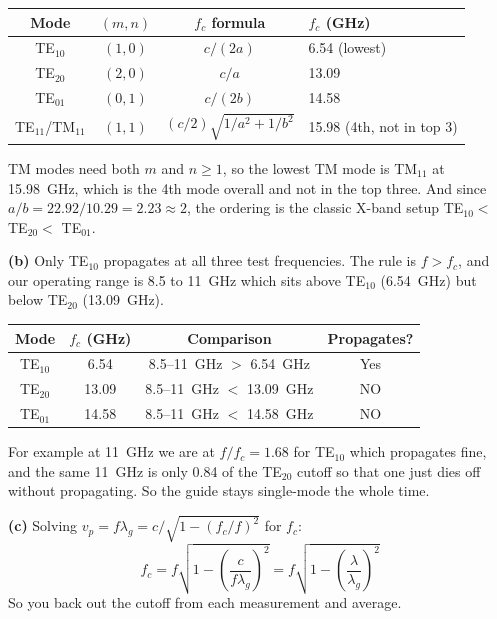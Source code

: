 \documentclass[11pt,letterpaper]{article}
\begin{document}
\begin{center}
\begin{tabular}{cccl}
\toprule
Mode & $(m,n)$ & $f_c$ formula & $f_c$ (GHz) \\
\midrule
TE$_{10}$         & $(1,0)$ & $c/(2a)$                  & 6.54 (lowest)        \\
TE$_{20}$         & $(2,0)$ & $c/a$                     & 13.09                \\
TE$_{01}$         & $(0,1)$ & $c/(2b)$                  & 14.58                \\
TE$_{11}$/TM$_{11}$ & $(1,1)$ & $(c/2)\sqrt{1/a^2+1/b^2}$ & 15.98 (4th, not in top 3) \\
\bottomrule
\end{tabular}
\end{center}

TM modes need both $m$ and $n \geq 1$, so the lowest TM mode is TM$_{11}$ at 15.98~GHz, which is the 4th mode overall and not in the top three. And since $a/b = 22.92/10.29 = 2.23 \approx 2$, the ordering is the classic X-band setup TE$_{10} <$ TE$_{20} <$ TE$_{01}$.

\textbf{(b)} Only TE$_{10}$ propagates at all three test frequencies. The rule is $f > f_c$, and our operating range is 8.5 to 11~GHz which sits above TE$_{10}$ (6.54~GHz) but below TE$_{20}$ (13.09~GHz).

\begin{center}
\begin{tabular}{cccc}
\toprule
Mode & $f_c$ (GHz) & Comparison & Propagates? \\
\midrule
TE$_{10}$ & 6.54  & 8.5--11~GHz $>$ 6.54~GHz  & Yes \\
TE$_{20}$ & 13.09 & 8.5--11~GHz $<$ 13.09~GHz & NO  \\
TE$_{01}$ & 14.58 & 8.5--11~GHz $<$ 14.58~GHz & NO  \\
\bottomrule
\end{tabular}
\end{center}

For example at 11~GHz we are at $f/f_c = 1.68$ for TE$_{10}$ which propagates fine, and the same 11~GHz is only 0.84 of the TE$_{20}$ cutoff so that one just dies off without propagating. So the guide stays single-mode the whole time.

\textbf{(c)} Solving $v_p = f\lambda_g = c/\sqrt{1 - (f_c/f)^2}$ for $f_c$:
\[
f_c = f\sqrt{1 - \left(\frac{c}{f\lambda_g}\right)^2} = f\sqrt{1 - \left(\frac{\lambda}{\lambda_g}\right)^2}
\]
So you back out the cutoff from each measurement and average.
\end{document}
